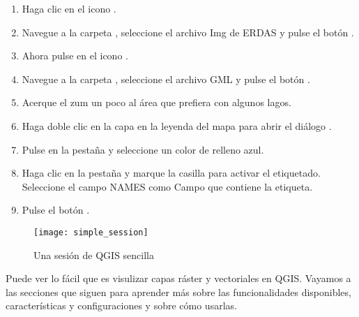 
\begin{enumerate}
\item Haga clic en el icono .
\item Navegue a la carpeta , seleccione el
archivo Img de ERDAS  y pulse el botón .
\item Ahora pulse en el icono .
\item Navegue a la carpeta , seleccione
el archivo GML  y pulse el botón .
\item Acerque el zum un poco al área que prefiera con algunos lagos.
\item Haga doble clic en la capa  en la leyenda del mapa para abrir el 
diálogo .
\item Pulse en la pestaña  y seleccione un color de relleno azul.
\item Haga clic en la pestaña  y marque la casilla  
para activar el etiquetado. Seleccione el campo NAMES como Campo que contiene la etiqueta.
\item Pulse el botón .
\end{enumerate} 

\begin{figure}[ht]
   \begin{center}
   \caption{Una sesión de QGIS sencilla \nixcaption}\label{fig:simple_session}\smallskip
   \texttt{[image: simple\_session]}
\end{center}  
\end{figure}

Puede ver lo fácil que es visulizar capas ráster y vectoriales en 
QGIS. Vayamos a las secciones que siguen para aprender más sobre las 
funcionalidades disponibles, características y configuraciones y sobre cómo usarlas.
